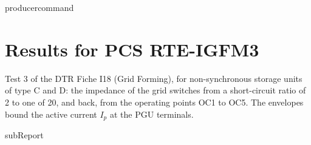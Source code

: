 {{ producercommand }}



    \section{Results for PCS RTE-IGFM3}

    Test 3 of the DTR Fiche I18 (Grid Forming), for non-synchronous storage units of type C
    and D: the impedance of the grid switches from a short-circuit ratio of 2 to
    one of 20, and back, from the operating points OC1 to OC5. The envelopes bound the active
    current \(I_p\) at the PGU terminals.

    {{subReport}}
    \newpage
